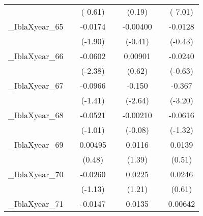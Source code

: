 {\begin{tabular}{l*{6}{c}}
            &                     &     (-0.61)         &                     &      (0.19)         &                     &     (-7.01)         \\
[1em]
\_IblaXyear\_65&                     &     -0.0174         &                     &    -0.00400         &                     &     -0.0128         \\
            &                     &     (-1.90)         &                     &     (-0.41)         &                     &     (-0.43)         \\
[1em]
\_IblaXyear\_66&                     &     -0.0602\sym{*}  &                     &     0.00901         &                     &     -0.0240         \\
            &                     &     (-2.38)         &                     &      (0.62)         &                     &     (-0.63)         \\
[1em]
\_IblaXyear\_67&                     &     -0.0966         &                     &      -0.150\sym{*}  &                     &      -0.367\sym{**} \\
            &                     &     (-1.41)         &                     &     (-2.64)         &                     &     (-3.20)         \\
[1em]
\_IblaXyear\_68&                     &     -0.0521         &                     &    -0.00210         &                     &     -0.0616         \\
            &                     &     (-1.01)         &                     &     (-0.08)         &                     &     (-1.32)         \\
[1em]
\_IblaXyear\_69&                     &     0.00495         &                     &      0.0116         &                     &      0.0139         \\
            &                     &      (0.48)         &                     &      (1.39)         &                     &      (0.51)         \\
[1em]
\_IblaXyear\_70&                     &     -0.0260         &                     &      0.0225         &                     &      0.0246         \\
            &                     &     (-1.13)         &                     &      (1.21)         &                     &      (0.61)         \\
[1em]
\_IblaXyear\_71&                     &     -0.0147         &                     &      0.0135         &                     &     0.00642         \\

\end{tabular}}
